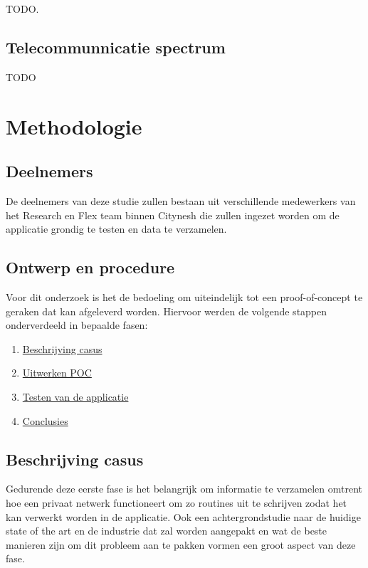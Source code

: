 TODO.

\subsection{Telecommunnicatie spectrum}

TODO 

\section{Methodologie}%
\label{sec:methodologie}

\subsection{Deelnemers}

De deelnemers van deze studie zullen bestaan uit verschillende medewerkers van het Research en Flex team binnen Citynesh die zullen ingezet worden om de applicatie grondig te testen en data te verzamelen.

\subsection{Ontwerp en procedure}

Voor dit onderzoek is het de bedoeling om uiteindelijk tot een proof-of-concept te geraken dat kan afgeleverd worden. Hiervoor werden de volgende stappen onderverdeeld in bepaalde fasen:

\begin{enumerate}
    \item \hyperref[subsub:beschrijving]{Beschrijving casus}
    \item \hyperref[subsub:uitwerking]{Uitwerken POC}
    \item \hyperref[subsub:testfase]{Testen van de applicatie}
    \item \hyperref[subsub:conclusies]{Conclusies}
\end{enumerate}

\subsection{Beschrijving casus}
\label{subsub:beschrijving}

Gedurende deze eerste fase is het belangrijk om informatie te verzamelen omtrent hoe een privaat netwerk functioneert om zo routines uit te schrijven zodat het kan verwerkt worden in de applicatie. Ook een achtergrondstudie naar de huidige state of the art en de industrie dat zal worden aangepakt en wat de beste manieren zijn om dit probleem aan te pakken vormen een groot aspect van deze fase. \\

